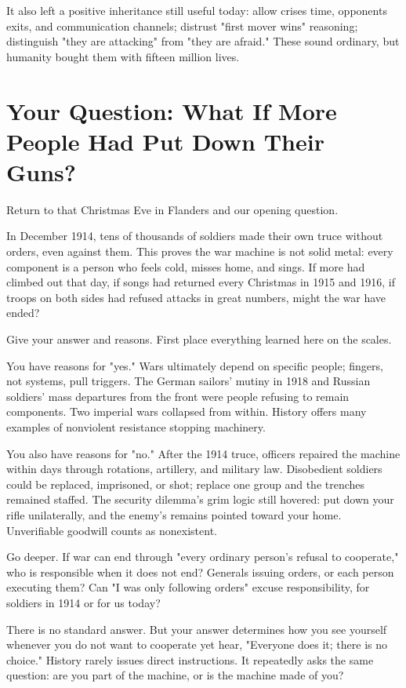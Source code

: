 It also left a positive inheritance still useful today: allow crises time, opponents exits, and communication channels; distrust "first mover wins" reasoning; distinguish "they are attacking" from "they are afraid." These sound ordinary, but humanity bought them with fifteen million lives.

\section[What If More Had Put Down Their Guns?]{Your Question: What If More People Had Put Down Their Guns?}
Return to that Christmas Eve in Flanders and our opening question.

In December 1914, tens of thousands of soldiers made their own truce without orders, even against them. This proves the war machine is not solid metal: every component is a person who feels cold, misses home, and sings. If more had climbed out that day, if songs had returned every Christmas in 1915 and 1916, if troops on both sides had refused attacks in great numbers, might the war have ended?

Give your answer and reasons. First place everything learned here on the scales.

You have reasons for "yes." Wars ultimately depend on specific people; fingers, not systems, pull triggers. The German sailors' mutiny in 1918 and Russian soldiers' mass departures from the front were people refusing to remain components. Two imperial wars collapsed from within. History offers many examples of nonviolent resistance stopping machinery.

You also have reasons for "no." After the 1914 truce, officers repaired the machine within days through rotations, artillery, and military law. Disobedient soldiers could be replaced, imprisoned, or shot; replace one group and the trenches remained staffed. The security dilemma's grim logic still hovered: put down your rifle unilaterally, and the enemy's remains pointed toward your home. Unverifiable goodwill counts as nonexistent.

Go deeper. If war can end through "every ordinary person's refusal to cooperate," who is responsible when it does not end? Generals issuing orders, or each person executing them? Can "I was only following orders" excuse responsibility, for soldiers in 1914 or for us today?

There is no standard answer. But your answer determines how you see yourself whenever you do not want to cooperate yet hear, "Everyone does it; there is no choice." History rarely issues direct instructions. It repeatedly asks the same question: are you part of the machine, or is the machine made of you?
